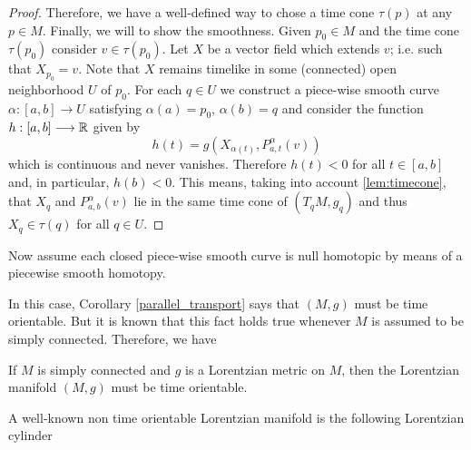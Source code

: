 \begin{proof}
    Therefore, we have a well-defined way to chose a time cone $\tau(p)$ at any $p \in M$. Finally, we will to show the smoothness. Given $p_0 \in M$ and the time cone $\tau(p_0)$ consider $v \in \tau(p_0)$. Let $X$ be a vector field which extends $v$; i.e. such that $X_{p_{0}}=v$. Note that $X$ remains timelike in some (connected) open neighborhood $U$ of $p_0$. For each $q \in U$ we construct a piece-wise smooth curve $\alpha : [a,b] \longrightarrow U$ satisfying $\alpha(a)=p_0$,
    $\alpha(b)=q$ and consider the function $h : [a,b] \longrightarrow \mathbb{R}$ given by
    \[
        h(t)=g(X_{\alpha(t)},P_{a,t}^{\alpha}(v))
    \]
    which is continuous and never vanishes. Therefore $h(t)<0$ for all $t\in [a,b]$ and, in particular, $h(b)<0$. This means, taking into account \autoref{lem:timecone}, that $X_q$ and $P_{a,b}^{\alpha}(v)$ lie in the same time cone of $(T_qM,g_q)$ and thus $X_q \in \tau(q)$ for all $q \in U$.
\end{proof}

Now assume each closed piece-wise smooth curve is null homotopic by means of a piecewise smooth homotopy.

In this case, Corollary \ref{parallel_transport} says that $(M,g)$ must be time orientable. But it is known that this fact holds true whenever $M$ is assumed to be simply connected. Therefore, we have

\begin{corollary}\label{simply_connected}
    If $M$ is simply connected and $g$ is a Lorentzian metric on $M$, then the Lorentzian manifold $(M,g)$ must be time orientable.
\end{corollary}


A well-known non time orientable Lorentzian manifold is the following Lorentzian cylinder \cite[Example 1.2.3]{sachs77}


